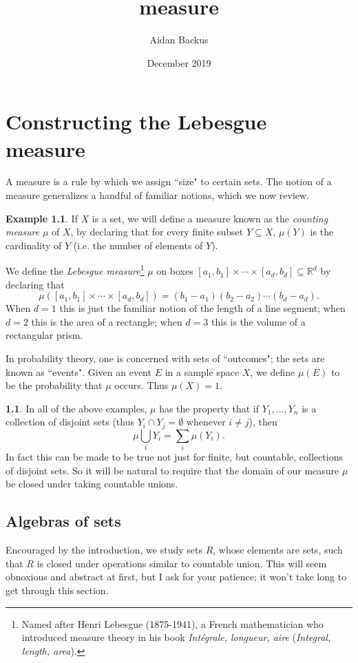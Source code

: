 \documentclass[12pt]{book}
\title{measure}
\author{Aidan Backus}
\date{December 2019}
\newcommand{\RR}{\mathbb{R}}
\newcommand{\dfn}[1]{\emph{#1}\index{#1}}
\theoremstyle{definition}
\newtheorem{subsec}[theorem]{}
\newtheorem{example}[theorem]{Example}
\begin{document}
\maketitle

\tableofcontents

\chapter{Constructing the Lebesgue measure}
\label{measureChapter}
A measure is a rule by which we assign ``size" to certain sets.
The notion of a measure generalizes a handful of familiar notions, which we now review.
\begin{example}
\label{examples of measures}
If $X$ is a set, we will define a measure known as the \dfn{counting measure} $\mu$ of $X$, by declaring that for every finite subset $Y \subseteq X$, $\mu(Y)$ is the cardinality of $Y$ (i.e. the number of elements of $Y$).

We define the \dfn{Lebesgue measure}\footnote{Named after Henri Lebesgue (1875-1941), a French mathematician who introduced measure theory in his book \emph{Intégrale, longueur, aire} (\emph{Integral, length, area}).}
$\mu$ on boxes $[a_1, b_1] \times \cdots \times [a_d, b_d] \subseteq \RR^d$ by declaring that
$$\mu([a_1, b_1] \times \cdots \times [a_d, b_d]) = (b_1 - a_1)(b_2 - a_2)\cdots(b_d - a_d).$$
When $d = 1$ this is just the familiar notion of the length of a line segment; when $d = 2$ this is the area of a rectangle; when $d = 3$ this is the volume of a rectangular prism.

In probability theory, one is concerned with sets of ``outcomes"; the sets are known as ``events". Given an event $E$ in a sample space $X$, we define $\mu(E)$ to be the probability that $\mu$ occurs. Thus $\mu(X) = 1$.
\end{example}

\begin{subsec}
In all of the above examples, $\mu$ has the property that if $Y_1, \dots, Y_n$ is a collection of disjoint sets (thus $Y_i \cap Y_j = \emptyset$ whenever $i \neq j$), then
$$\mu\bigcup_i Y_i = \sum_i \mu(Y_i).$$
In fact this can be made to be true not just for finite, but countable, collections of disjoint sets.
So it will be natural to require that the domain of our measure $\mu$ be closed under taking countable unions.
\end{subsec}

\section{Algebras of sets}
Encouraged by the introduction, we study sets $R$, whose elements are sets, such that $R$ is closed under operations similar to countable union.
This will seem obnoxious and abstract at first, but I ask for your patience; it won't take long to get through this section.
\end{document}
